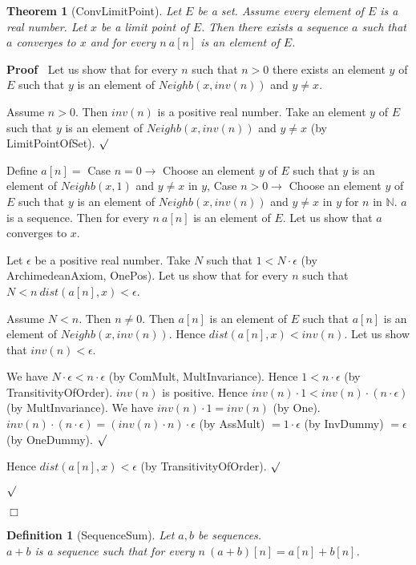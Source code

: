 \documentclass{article}
\newenvironment{forthel}{\begin{leftbar}}{\end{leftbar}}
\newenvironment{proof}{\noindent\textbf{Proof\ }}{\hspace*{\fill}$\Box$\medskip}
\newenvironment{subproof}{\begin{list}{}{}
		\item[\text{Proof}]}{\hfill $\surd$ \end{list}}
\newtheorem{theorem}{Theorem}
\newtheorem{definition}{Definition}
\newcommand{\NN}{\mathbb{N}}
\newcommand{\plusone}{+}
\newcommand{\dotequal}{=}
\begin{document}
\begin{forthel}
	\begin{theorem}[ConvLimitPoint]
	Let $E$ be a set. Assume every element of $E$ is a real number. Let $x$ be a limit point of $E$.
	Then there exists a sequence $a$ such that $a$ converges to $x$ and for every $n \ a[n]$ is an element of $E$.
	\end{theorem}
	\begin{proof}
	Let us show that for every $n$ such that $n > 0$ there exists an element $y$ of $E$ such that
	$y$ is an element of $Neighb(x,inv(n))$ and $y \neq x$.
	\begin{subproof}
	Assume $n > 0$.
	Then $inv(n)$ is a positive real number.
	Take an element $y$ of $E$ such that $y$ is an element of $Neighb(x,inv(n))$
	and $y \neq x$ (by LimitPointOfSet).
	\end{subproof}
	Define $a[n] =$ Case $n = 0 \rightarrow$ Choose an element $y$ of $E$ such that $y$ is an element of
	$Neighb(x,1)$ and $y \neq x$ in $y$,
	Case $n > 0 \rightarrow$ Choose an element $y$ of $E$ such that $y$ is an element of
	$Neighb(x,inv(n))$ and $y \neq x$ in $y$
	for $n$ in $\NN$.
	$a$ is a sequence.	
	Then for every $n \ a[n]$ is an element of $E$.
	Let us show that $a$ converges to $x$.
	\begin{subproof}
	Let $\epsilon$ be a positive real number.
	Take $N$ such that $1 < N \cdot \epsilon$ (by ArchimedeanAxiom, OnePos).
	Let us show that for every $n$ such that $N < n \ dist(a[n],x) < \epsilon$.
	\begin{subproof}
	Assume $N < n$. Then $n \neq 0$.
	Then $a[n]$ is an element of $E$ such that $a[n]$ is an element of $Neighb(x,inv(n))$.
	Hence $dist(a[n],x) < inv(n)$.
	Let us show that $inv(n) < \epsilon$.
	\begin{subproof}
	We have $N \cdot \epsilon < n \cdot \epsilon$ (by ComMult, MultInvariance).
	Hence $1 < n \cdot \epsilon$ (by TransitivityOfOrder).
	$inv(n)$ is positive.
	Hence $inv(n) \cdot 1 < inv(n) \cdot (n \cdot \epsilon)$ (by MultInvariance).
	We have $inv(n) \cdot 1 = inv(n)$ (by One).
	$inv(n) \cdot (n \cdot \epsilon) \dotequal (inv(n) \cdot n) \cdot \epsilon$ (by AssMult)
	$\dotequal 1 \cdot \epsilon$ (by InvDummy)
	$\dotequal \epsilon$ (by OneDummy).
	\end{subproof}
	Hence $dist(a[n],x) < \epsilon$ (by TransitivityOfOrder).
	\end{subproof}
	\end{subproof}
	\end{proof}
	
	\begin{definition}[SequenceSum]
	Let $a,b$ be sequences. \\$a \plusone b$ is a sequence such that for every $n \ (a \plusone b)[n] = a[n] + b[n]$.
	\end{definition}
	

\end{forthel}
\end{document}
